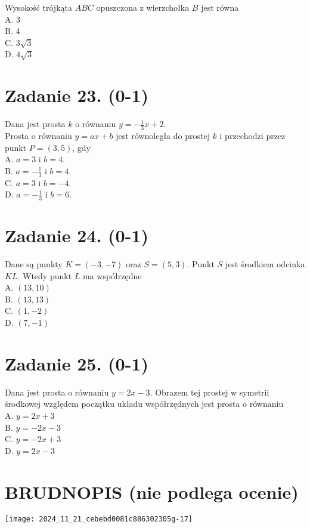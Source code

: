 \documentclass[10pt]{article}
\begin{document}
Wysokość trójkąta \(A B C\) opuszczona z wierzchołka \(B\) jest równa\\
A. 3\\
B. 4\\
C. \(3 \sqrt{3}\)\\
D. \(4 \sqrt{3}\)

\section*{Zadanie 23. (0-1)}
Dana jest prosta \(k\) o równaniu \(y=-\frac{1}{3} x+2\).\\
Prosta o równaniu \(y=a x+b\) jest równoległa do prostej \(k\) i przechodzi przez punkt \(P=(3,5)\), gdy\\
A. \(a=3\) i \(b=4\).\\
B. \(a=-\frac{1}{3}\) i \(b=4\).\\
C. \(a=3\) i \(b=-4\).\\
D. \(a=-\frac{1}{3}\) i \(b=6\).

\section*{Zadanie 24. (0-1)}
Dane są punkty \(K=(-3,-7)\) oraz \(S=(5,3)\). Punkt \(S\) jest środkiem odcinka \(K L\). Wtedy punkt \(L\) ma współrzędne\\
A. \((13,10)\)\\
B. \((13,13)\)\\
C. \((1,-2)\)\\
D. \((7,-1)\)

\section*{Zadanie 25. (0-1)}
Dana jest prosta o równaniu \(y=2 x-3\). Obrazem tej prostej w symetrii środkowej względem początku układu współrzędnych jest prosta o równaniu\\
A. \(y=2 x+3\)\\
B. \(y=-2 x-3\)\\
C. \(y=-2 x+3\)\\
D. \(y=2 x-3\)

\section*{BRUDNOPIS (nie podlega ocenie)}
\begin{center}
\texttt{[image: 2024\_11\_21\_cebebd0081c886302305g-17]}
\end{center}
\end{document}

